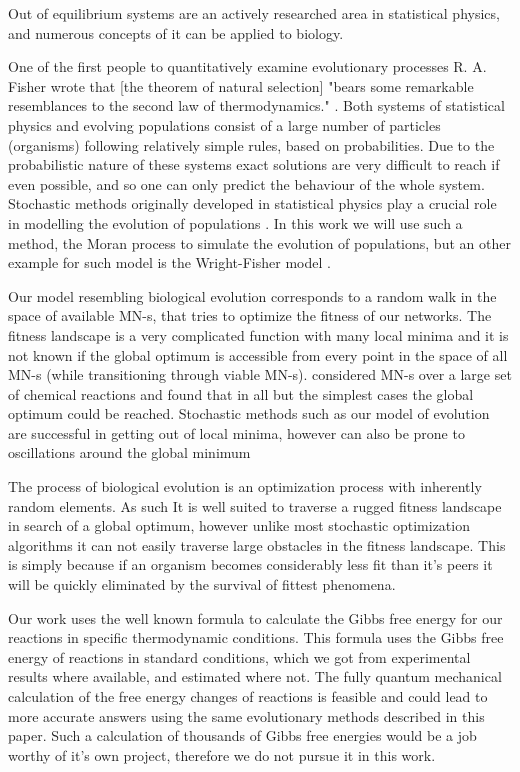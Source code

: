\documentclass[a4paper,12pt]{article}
\begin{document}
	Out of equilibrium systems are an actively researched area in statistical physics, and numerous concepts of it can be applied to biology. 
	
	One of the first people to quantitatively examine evolutionary processes R. A. Fisher wrote that [the theorem of natural selection] "bears some remarkable resemblances to the second law of thermodynamics." \cite{fisherevolution}. Both systems of statistical physics and evolving populations consist of a large number of particles (organisms) following relatively simple rules, based on probabilities. Due to the probabilistic nature of these systems exact solutions are very difficult to reach if even possible, and so one can only predict the behaviour of the whole system. Stochastic methods originally developed in statistical physics play a crucial role in modelling the evolution of populations \cite{stochasticblythe}. In this work we will use such a method, the Moran process \cite{moranprocess} to simulate the evolution of populations, but an other example for such model is the Wright-Fisher model \cite{mathematicalpopgen}.

	Our model resembling biological evolution corresponds to a random walk in the space of available MN-s, that tries to optimize the fitness of our networks. The fitness landscape is a very complicated function with many local minima and it is not known if the global optimum is accessible from every point in the space of all MN-s (while transitioning through viable MN-s). \cite{historical} considered MN-s over a large set of chemical reactions and found that in all but the simplest cases the global optimum could be reached. Stochastic methods such as our model of evolution are successful in getting out of local minima, however can also be prone to oscillations around the global minimum 

	The process of biological evolution is an optimization process with inherently random elements. As such It is well suited to traverse a rugged fitness landscape in search of a global optimum, however unlike most stochastic optimization algorithms it can not easily traverse large obstacles in the fitness landscape. This is simply because if an organism becomes considerably less fit than it's peers it will be quickly eliminated by the survival of fittest phenomena.

	Our work uses the well known formula to calculate the Gibbs free energy for our reactions in specific thermodynamic conditions. This formula uses the Gibbs free energy of reactions in standard conditions, which we got from experimental results where available, and estimated \cite{BartekLower} where not. The fully quantum mechanical calculation of the free energy changes of reactions is feasible and could lead to more accurate answers using the same evolutionary methods described in this paper. Such a calculation of thousands of Gibbs free energies would be a job worthy of it's own project, therefore we do not pursue it in this work. 
\end{document}
